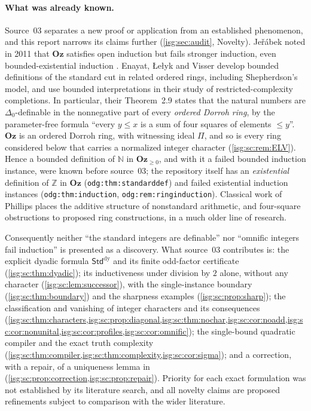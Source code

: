 \documentclass[11pt]{article}
\theoremstyle{definition}
\theoremstyle{remark}
\newcommand{\Oz}{\ensuremath{\mathbf{Oz}}}
\newcommand{\Z}{\mathbb{Z}}
\newcommand{\N}{\mathbb{N}}
\newcommand{\StdDy}{\mathsf{Std}^{\mathrm{dy}}}
\newcommand{\replabel}[1]{\nolinkurl{#1}}
\begin{document}
\paragraph{What was already known.} Source~03 separates a new proof or
application from an established phenomenon, and this report narrows its
claims further (\cref{isg:sec:audit}, Novelty).
Je\v r\'abek noted in 2011 that $\Oz$ satisfies open induction but fails
stronger induction, even bounded-existential induction \cite{JerabekMO}.
Enayat, \L e\l yk and Visser \cite[Sections~2.5, 4.2 and 5.2]{ELV} develop
bounded definitions of the standard cut in related ordered rings,
including Shepherdson's model, and use bounded interpretations in their
study of restricted-complexity completions. In particular, their
Theorem~2.9 states that the natural numbers are $\Delta_0$-definable in
the nonnegative part of every \emph{ordered Dorroh ring}, by the
parameter-free formula ``every $y\le x$ is a sum of four squares of
elements $\le y$''. $\Oz$ is an ordered Dorroh ring, with witnessing ideal
$\Pi$, and so is every ring considered below that carries a normalized
integer character (\cref{isg:sc:rem:ELV}). Hence a bounded definition of
$\N$ in $\Oz_{\ge0}$, and with it a failed bounded induction instance,
were known before source~03; the repository itself has an
\emph{existential} definition of $\Z$ in $\Oz$
(\replabel{odg:thm:standarddef}) and failed existential induction instances
(\replabel{odg:thm:induction}, \replabel{odg:rem:ringinduction}). Classical
work of Phillips \cite{Phillips} places the additive structure of
nonstandard arithmetic, and four-square obstructions to proposed ring
constructions, in a much older line of research.

Consequently neither ``the standard integers are definable'' nor
``omnific integers fail induction'' is presented as a discovery. What
source~03 contributes is: the explicit dyadic formula $\StdDy$ and its
finite odd-factor certificate (\cref{isg:sc:thm:dyadic}); its
inductiveness under division by $2$ alone, without any character
(\cref{isg:sc:lem:successor}), with the single-instance boundary
(\cref{isg:sc:thm:boundary}) and the sharpness examples
(\cref{isg:sc:prop:sharp}); the classification and vanishing of integer
characters and its consequences
(\cref{isg:sc:thm:characters,isg:sc:prop:diagonal,isg:sc:thm:nochar,isg:sc:cor:noadd,isg:sc:cor:nonunital,isg:sc:cor:profiles,isg:sc:cor:omnific});
the single-bound quadratic compiler and the exact truth complexity
(\cref{isg:sc:thm:compiler,isg:sc:thm:complexity,isg:sc:cor:sigma}); and a
correction, with a repair, of a uniqueness lemma in \cite{ELV}
(\cref{isg:sc:prop:correction,isg:sc:prop:repair}). Priority for each exact
formulation was not established by its literature search, and all novelty
claims are proposed refinements subject to comparison with the wider
literature.
\end{document}
